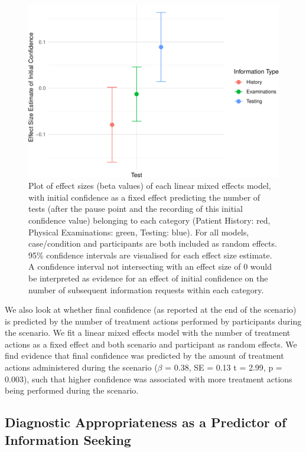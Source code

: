 \documentclass[a4paper, nobind]{templates/ociamthesis}
\begin{document}
\begin{figure}[H]

{\centering \includegraphics[width=1\linewidth]{_main_files/figure-latex/finalconfidenceplot-1} 

}

\caption{Plot of effect sizes (beta values) of each linear mixed effects model, with initial confidence as a fixed effect predicting the number of tests (after the pause point and the recording of this initial confidence value) belonging to each category (Patient History: red, Physical Examinations: green, Testing: blue). For all models, case/condition and participants are both included as random effects. 95\% confidence intervals are visualised for each effect size estimate. A confidence interval not intersecting with an effect size of 0 would be interpreted as evidence for an effect of initial confidence on the number of subsequent information requests within each category.}\label{fig:finalconfidenceplot}
\end{figure}

We also look at whether final confidence (as reported at the end of the scenario) is predicted by the number of treatment actions performed by participants during the scenario. We fit a linear mixed effects model with the number of treatment actions as a fixed effect and both scenario and participant as random effects. We find evidence that final confidence was predicted by the amount of treatment actions administered during the scenario (\(\beta\) = 0.38, SE = 0.13 t = 2.99, p = 0.003), such that higher confidence was associated with more treatment actions being performed during the scenario.

\subsection{Diagnostic Appropriateness as a Predictor of Information Seeking}\label{diagnostic-appropriateness-as-a-predictor-of-information-seeking}
\end{document}
